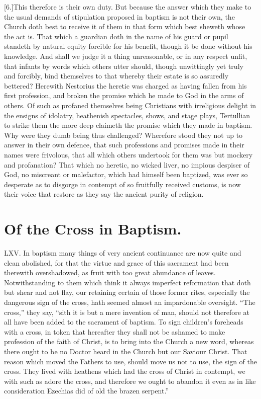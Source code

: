 [6.]This therefore is their own duty. But because the answer which they make to the usual demands of stipulation proposed in baptism is not their own, the Church doth best to receive it of them in that form which best sheweth whose the act is. That which a guardian doth in the name of his guard or pupil standeth by natural equity forcible for his benefit, though it be done without his knowledge. And shall we judge it a thing unreasonable, or in any respect unfit, that infants by words which others utter should, though unwittingly yet truly and forcibly, bind themselves to that whereby their estate is so assuredly bettered? Herewith Nestorius the heretic was charged as having fallen from his  first profession, and broken the promise which he made to God in the arms of others.
 Of such as profaned themselves being Christians with irreligious delight in the ensigns of idolatry, heathenish spectacles, shows, and stage plays, Tertullian to strike them the more deep claimeth the promise which they made in baptism. Why were they dumb being thus challenged? Wherefore stood they not up to answer in their own defence, that such professions and promises made in their names were frivolous, that all which others undertook for them was but mockery and profanation? That which no heretic, no wicked liver, no impious despiser of God, no miscreant or malefactor, which had himself been baptized, was ever so desperate as to disgorge in contempt of so fruitfully received customs, is now their voice that restore as they say the ancient purity of religion.


\section*{Of the Cross in Baptism.}
LXV. In baptism many things of very ancient continuance are now quite and clean abolished, for that the virtue and grace of this sacrament had been therewith overshadowed, as fruit with too great abundance of leaves. Notwithstanding to them which think it always imperfect reformation that doth but shear and not flay, our retaining certain of those former rites, especially the dangerous sign of the cross, hath seemed almost an impardonable oversight. “The cross,” they say, “sith it is but a mere invention of man, should not therefore at all have been added to the sacrament of baptism. To sign children’s foreheads with a cross, in token that hereafter they shall not be ashamed to make profession of the faith of Christ, is to bring into the Church a new word, whereas there ought to be no Doctor heard in the Church but our Saviour Christ. That reason which moved the Fathers to use, should move us not to use, the sign of the cross. They lived with heathens which had the cross of Christ in contempt, we with such as adore the cross, and  therefore we ought to abandon it even as in like consideration Ezechias did of old the brazen serpent.”

